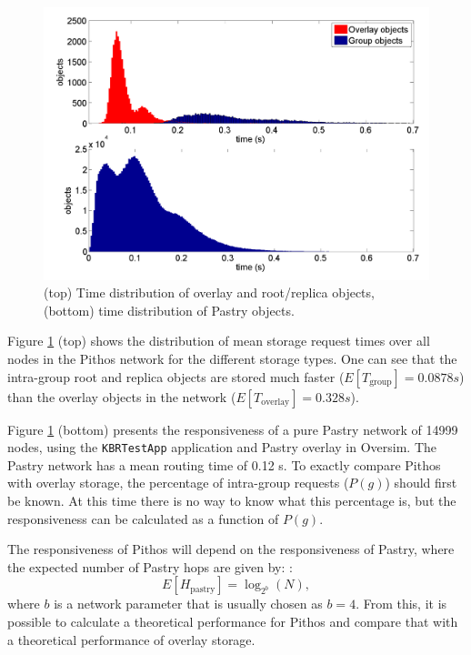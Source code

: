 \documentclass[10pt,a4paper,conference]{IEEEtran}
\begin{document}
\begin{figure}[htbp]
 \centering
 \includegraphics[clip=true, viewport=1cm 0.5cm 29cm 20.5cm, width=\columnwidth]{StoreTimes}
 \caption{(top) Time distribution of overlay and root/replica objects, (bottom) time distribution of Pastry objects.}
 \label{fig_pithos_response}
\end{figure}
%
Figure \ref{fig_pithos_response} (top) shows the distribution of mean storage request times over all nodes in the Pithos network for the different
storage types. One can see that the intra-group root and replica objects are stored much faster ($E\left[T_{\textrm{group}}\right] = 0.0878 s$) than
the overlay objects in the network ($E\left[T_{\textrm{overlay}}\right] = 0.328 s$).

Figure \ref{fig_pithos_response} (bottom) presents the responsiveness of a pure Pastry network of 14999 nodes, using the \verb.KBRTestApp.
application and Pastry overlay in Oversim. The Pastry network has a mean routing time of 0.12 s. To exactly compare Pithos with overlay storage, the
percentage of intra-group requests ($P(g)$) should first be known. At this time there is no way to know what this percentage is, but the
responsiveness can be calculated as a function of $P(g)$.

The responsiveness of Pithos will depend on the responsiveness of Pastry, where the expected number of Pastry hops are given by:
\cite{storage_and_chaching_PAST}:
%
\begin{equation}\label{pastry_hops}
    E[H_{\textrm{pastry}}] = \log_{2^b}\left(N\right),
\end{equation}
%
where $b$ is a network parameter that is usually chosen as $b = 4$. From this, it is possible to calculate a theoretical performance for Pithos and
compare that with a theoretical performance of overlay storage.
\end{document}
